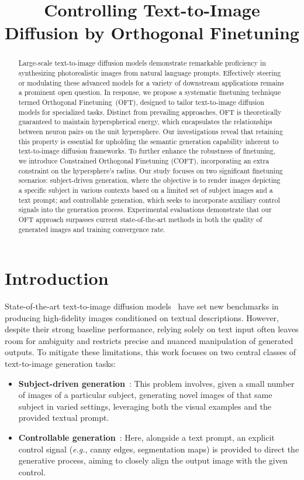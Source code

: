 \title{Controlling Text-to-Image Diffusion by Orthogonal Finetuning}

\begin{abstract}
Large-scale text-to-image diffusion models demonstrate remarkable proficiency in synthesizing photorealistic images from natural language prompts. Effectively steering or modulating these advanced models for a variety of downstream applications remains a prominent open question. In response, we propose a systematic finetuning technique termed Orthogonal Finetuning~(OFT), designed to tailor text-to-image diffusion models for specialized tasks. Distinct from prevailing approaches, OFT is theoretically guaranteed to maintain hyperspherical energy, which encapsulates the relationships between neuron pairs on the unit hypersphere. Our investigations reveal that retaining this property is essential for upholding the semantic generation capability inherent to text-to-image diffusion frameworks. To further enhance the robustness of finetuning, we introduce Constrained Orthogonal Finetuning (COFT), incorporating an extra constraint on the hypersphere's radius. Our study focuses on two significant finetuning scenarios: subject-driven generation, where the objective is to render images depicting a specific subject in various contexts based on a limited set of subject images and a text prompt; and controllable generation, which seeks to incorporate auxiliary control signals into the generation process. Experimental evaluations demonstrate that our OFT approach surpasses current state-of-the-art methods in both the quality of generated images and training convergence rate.
\end{abstract}

\section{Introduction}

State-of-the-art text-to-image diffusion models~\cite{saharia2022photorealistic,ramesh2022hierarchical,rombach2022high} have set new benchmarks in producing high-fidelity images conditioned on textual descriptions. However, despite their strong baseline performance, relying solely on text input often leaves room for ambiguity and restricts precise and nuanced manipulation of generated outputs. To mitigate these limitations, this work focuses on two central classes of text-to-image generation tasks:

\begin{itemize}[leftmargin=*,nosep]

    \item \textbf{Subject-driven generation}~\cite{ruiz2023dreambooth}: This problem involves, given a small number of images of a particular subject, generating novel images of that same subject in varied settings, leveraging both the visual examples and the provided textual prompt.
    \item \textbf{Controllable generation}~\cite{zhang2023adding,mou2023t2i}: Here, alongside a text prompt, an explicit control signal (\emph{e.g.}, canny edges, segmentation maps) is provided to direct the generative process, aiming to closely align the output image with the given control.
\end{itemize}

